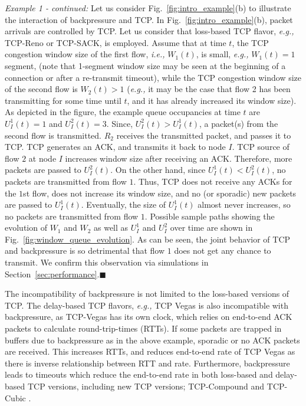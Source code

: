 \documentclass[conference]{IEEEtran}
\newcommand{\ie}{{\em i.e., }}
\newcommand{\eg}{{\em e.g., }}
\begin{document}
{\em Example 1 - continued:} Let us consider Fig.~\ref{fig:intro_example}(b) to illustrate the interaction of backpressure and TCP. In Fig.~\ref{fig:intro_example}(b), packet arrivals are controlled by TCP. Let us consider that loss-based TCP flavor, \eg TCP-Reno or TCP-SACK, is employed. Assume that at time $t$, the TCP congestion window size of the first flow, \ie $W_1(t)$, is small, \eg $W_1(t) = 1$ segment, (note that 1-segment window size may be seen at the beginning of a connection or after a re-transmit timeout), while the TCP congestion window size of the second flow is $W_2(t) > 1$ (\eg it may be the case that flow 2 has been transmitting for some time until $t$, and it has already increased its window size). As depicted in the figure, the example queue occupancies at time $t$ are $U_{I}^{1}(t) = 1$ and $U_{I}^{2}(t) = 3$. Since, $U_{I}^{2}(t) > U_{I}^{1}(t)$, a packet(s) from the second flow is transmitted. $R_2$ receives the transmitted packet, and passes it to TCP. TCP generates an ACK, and transmits it back to node $I$. TCP source of flow $2$ at node $I$ increases window size after receiving an ACK. Therefore, more packets are passed to $U_{I}^{2}(t)$. On the other hand, since $U_{I}^{1}(t) < U_{I}^{2}(t)$, no packets are transmitted from flow $1$. Thus, TCP does not receive any ACKs for the $1$st flow, does not increase its window size, and no (or sporadic) new packets are passed to $U_{I}^{1}(t)$. Eventually, the size of $U_{I}^{1}(t)$ almost never increases, so no packets are transmitted from flow $1$. Possible sample paths showing the evolution of $W_1$ and $W_2$ as well as $U_{I}^{1}$ and $U_{I}^{2}$ over time are shown in Fig.~\ref{fig:window_queue_evolution}. As can be seen, the joint behavior of TCP and backpressure is so detrimental that flow $1$ does not get any chance to transmit. We confirm this observation via simulations in Section~\ref{sec:performance}.\hfill $\blacksquare$


The incompatibility of backpressure is not limited to the loss-based versions of TCP. The delay-based TCP flavors, \eg TCP Vegas is also incompatible with backpressure, as TCP-Vegas has its own clock, which relies on end-to-end ACK packets to calculate round-trip-times (RTTs). If some packets are trapped in buffers due to backpressure as in the above example, sporadic or no ACK packets are received. This increases RTTs, and reduces end-to-end rate of TCP Vegas as there is inverse relationship between RTT and rate. Furthermore, backpressure leads to timeouts which reduce the end-to-end rate in both loss-based and delay-based TCP versions, including new TCP versions; TCP-Compound \cite{tcp_compound} and TCP-Cubic \cite{tcp_cubic}.
\end{document}
